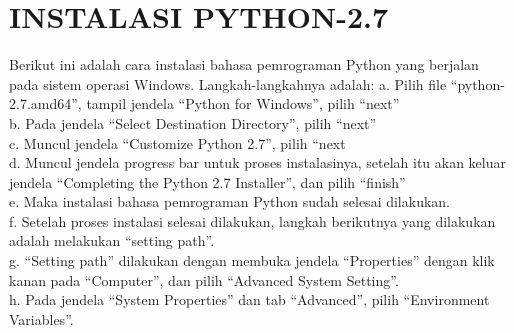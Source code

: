  \section{INSTALASI PYTHON-2.7}
Berikut ini adalah cara instalasi bahasa pemrograman Python yang berjalan pada sistem operasi Windows. Langkah-langkahnya adalah: 
a. Pilih file “python-2.7.amd64”, tampil jendela “Python for Windows”, pilih “next” \\
b. Pada jendela “Select Destination Directory”, pilih “next”\\
 c. Muncul jendela “Customize Python 2.7”, pilih “next\\
 d. Muncul jendela progress bar untuk proses instalasinya, setelah itu akan keluar jendela “Completing the Python 2.7 Installer”, dan pilih “finish” \\
 e. Maka instalasi bahasa pemrograman Python sudah selesai dilakukan.\\ 
 f. Setelah proses instalasi selesai dilakukan, langkah berikutnya yang dilakukan adalah melakukan “setting path”. \\
 g. “Setting path” dilakukan dengan membuka jendela “Properties” dengan klik kanan pada “Computer”, dan pilih “Advanced System Setting”.\\ 
 h. Pada jendela “System Properties” dan tab “Advanced”, pilih “Environment Variables”\cite{wicaksana2013user}.\\
